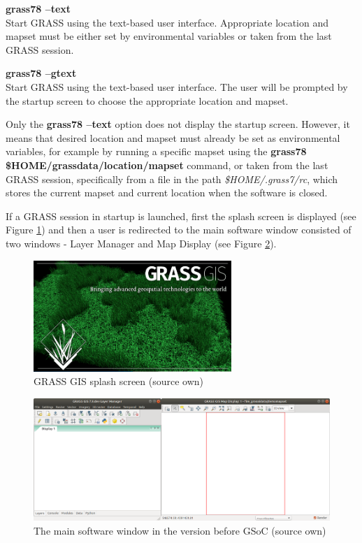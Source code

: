 \documentclass[a4paper,10pt,twoside]{article}
\begin{document}
\noindent \textbf{grass78 --text} \\
\noindent Start GRASS using the text-based user interface. Appropriate location and mapset must be either set by environmental variables or taken from the last GRASS session.

\noindent \textbf{grass78 --gtext} \\
\noindent Start GRASS using the text-based user interface. The user will be prompted by the startup screen to choose the appropriate location and mapset.

Only the \textbf{grass78 --text} option does not display the startup screen. However, it means that desired location and mapset must already be set as environmental variables, for example by running a specific mapset using the \textbf{grass78 \$HOME/grassdata/location/mapset} command, or taken from the last GRASS session, specifically from a file in the path \textit{\$HOME/.grass7/rc}, which stores the current mapset and current location when the software is closed.

If a GRASS session in startup is launched, first the splash screen is displayed (see Figure \ref{fig:splash_screen}) and then a user is redirected to the main software window consisted of two windows - Layer Manager and Map Display (see Figure \ref{fig:empty_layers1}). 

\vspace{0.3cm}
\begin{figure}[hbt!] 
\begin{center}
\includegraphics[width=7.5cm]{pictures/splash_screen.png} 
\caption[GRASS GIS splash screen]{GRASS GIS splash screen (source own)}
\label{fig:splash_screen}
\end{center}
\end{figure}

\vspace{0.3cm}
\begin{figure}[hbt!] 
\begin{center}
\includegraphics[width=15cm]{pictures/empty_layers1.png} 
\caption[The main software window (version before GSoC)]{The main software window in the version before GSoC (source own)}
\label{fig:empty_layers1}
\end{center}
\end{figure}
\end{document}
